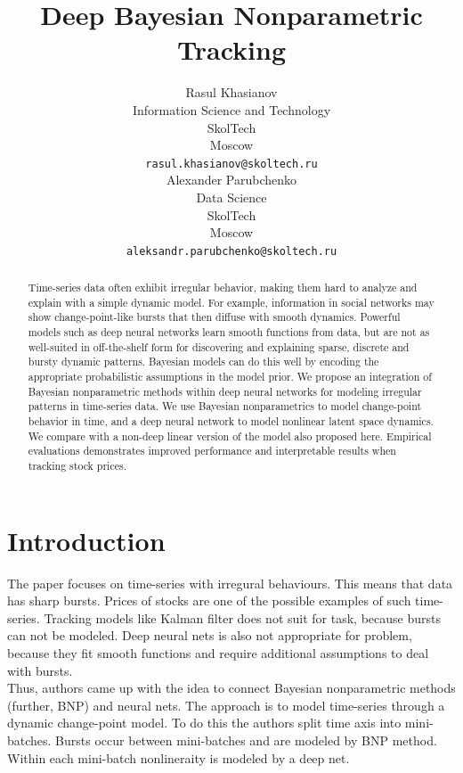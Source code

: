 \documentclass{article}
\title{Deep Bayesian Nonparametric Tracking}
\author{
  Rasul Khasianov\\
  Information Science and Technology\\
  SkolTech\\
  Moscow \\
  \texttt{rasul.khasianov@skoltech.ru} \\
   \And
 Alexander Parubchenko \\
  Data Science\\
  SkolTech\\
  Moscow \\
  \texttt{aleksandr.parubchenko@skoltech.ru} \\}
\begin{document}
\maketitle

\begin{abstract}
Time-series data often exhibit irregular behavior, making them hard to analyze and explain with a simple dynamic model. For example, information in social networks may show change-point-like bursts that then diffuse with smooth dynamics. Powerful models such as deep neural networks learn smooth functions from data, but are not as well-suited in off-the-shelf form for discovering and explaining sparse, discrete and bursty dynamic patterns. Bayesian models can do this well by encoding the appropriate probabilistic assumptions in the model prior. We propose an integration of Bayesian nonparametric methods within deep neural networks for modeling irregular patterns in time-series data. We use Bayesian nonparametrics to model change-point behavior in time, and a deep neural network to model nonlinear latent space dynamics. We compare with a non-deep linear version of the model also proposed here. Empirical evaluations demonstrates improved performance and interpretable results when tracking stock prices.
\end{abstract}




\section{Introduction}

The paper focuses on time-series with irregural behaviours. This means that data has sharp bursts. Prices of stocks are one of the possible examples of such time-series. Tracking models like Kalman filter does not suit for task, because bursts can not be modeled. Deep neural nets is also not appropriate for problem, because they fit smooth functions and require additional assumptions to deal with bursts.\\
Thus, authors came up with the idea to connect Bayesian nonparametric methods (further, BNP) and neural nets. The approach is to model time-series through a dynamic change-point model. To do this the authors split time axis into mini-batches. Bursts occur between mini-batches and are modeled by BNP method. Within each mini-batch nonlineraity is modeled by a deep net.
\end{document}

